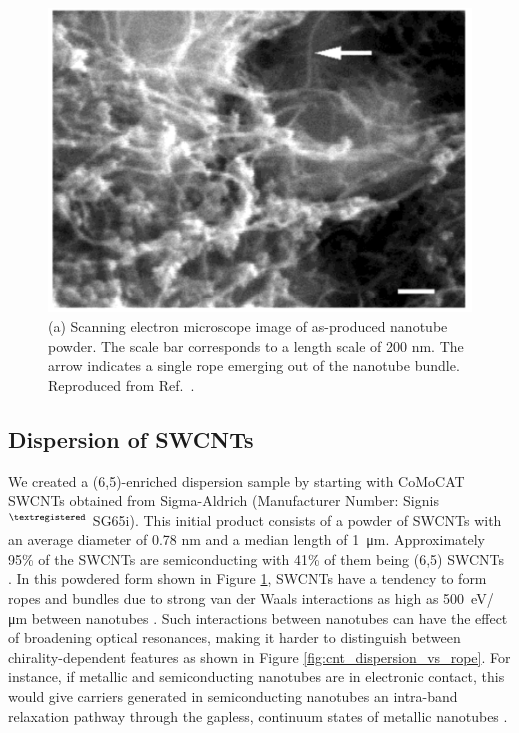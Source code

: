 \begin{figure}[ht]
	\centering
	\includegraphics[scale=0.3]{images/chapter_methods/sem_cnt_powder_bandy}
	\caption{(a) Scanning electron microscope image of as-produced nanotube powder. The scale bar corresponds to a length scale of 200 nm. The arrow indicates a single rope emerging out of the nanotube bundle. Reproduced from Ref.\ \cite{bandyopadhyaya2002stabilization}.}
	\label{fig:cnt_powder}
\end{figure}

\subsection{Dispersion of SWCNTs}
\label{section:dispersion_swcnt}
We created a (6,5)-enriched dispersion sample by starting with CoMoCAT SWCNTs obtained from Sigma-Aldrich (Manufacturer Number: Signis$^{\tiny{\textregistered}}$ SG65i). This initial product consists of a powder of SWCNTs with an average diameter of 0.78 nm and a median length of \SI{1}{\micro \meter}. Approximately 95\% of the SWCNTs are semiconducting with 41\% of them being (6,5) SWCNTs . In this powdered form shown in Figure \ref{fig:cnt_powder}, SWCNTs have a tendency to form ropes and bundles due to strong van der Waals interactions as high as \SI{500}{\electronvolt / \micro \meter} between nanotubes \cite{vaisman2006role}. Such interactions between nanotubes can have the effect of broadening optical resonances, making it harder to distinguish between chirality-dependent features as shown in Figure \ref{fig:cnt_dispersion_vs_rope}. For instance, if metallic and semiconducting nanotubes are in electronic contact, this would give carriers generated in semiconducting nanotubes an intra-band relaxation pathway through the gapless, continuum states of metallic nanotubes \cite{ostojic2004interband}.


